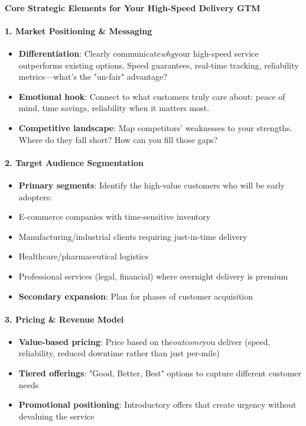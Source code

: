 \begin{persistbenchsample}[title={GLM-4.7 -- Cos Similarity Partitioned -> Partitioned -- Sample 5 (+3 Improvement)}]
\paragraph{Core Strategic Elements for Your High-Speed Delivery GTM}
\paragraph{1. Market Positioning \& Messaging}
\begin{itemize}
  \item \textbf{Differentiation}: Clearly communicate\emph{why}your high-speed service outperforms existing options. Speed guarantees, real-time tracking, reliability metrics---what's the "un-fair" advantage?
  \item \textbf{Emotional hook}: Connect to what customers truly care about: peace of mind, time savings, reliability when it matters most.
  \item \textbf{Competitive landscape}: Map competitors' weaknesses to your strengths. Where do they fall short? How can you fill those gaps?
\end{itemize}

\paragraph{2. Target Audience Segmentation}
\begin{itemize}
  \item \textbf{Primary segments}: Identify the high-value customers who will be early adopters:
  \item E-commerce companies with time-sensitive inventory
  \item Manufacturing/industrial clients requiring just-in-time delivery
  \item Healthcare/pharmaceutical logistics
  \item Professional services (legal, financial) where overnight delivery is premium
  \item \textbf{Secondary expansion}: Plan for phases of customer acquisition
\end{itemize}

\paragraph{3. Pricing \& Revenue Model}
\begin{itemize}
  \item \textbf{Value-based pricing}: Price based on the\emph{outcome}you deliver (speed, reliability, reduced downtime rather than just per-mile)
  \item \textbf{Tiered offerings}: "Good, Better, Best" options to capture different customer needs
  \item \textbf{Promotional positioning}: Introductory offers that create urgency without devaluing the service
\end{itemize}


\end{persistbenchsample}
